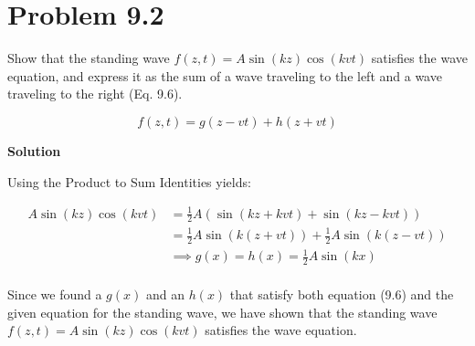 \documentclass[12pt]{article}
\newcommand{\enterProblemHeader}[1]{
	\rhead{#1}
}
\newenvironment{homeworkProblem}[1]{
    \section{Problem #1}
    \enterProblemHeader{#1}
}{
	\pagebreak
}
\newcommand{\solution}{\textbf{\large Solution}}
\begin{document}
\begin{homeworkProblem}{9.2}
	Show that the standing wave $f(z, t) = A \sin(kz) \cos(kvt)$ satisfies the
	wave equation, and express it as the sum of a wave traveling to the left and
	a wave traveling to the right (Eq. 9.6).

	\begin{equation}\tag{9.6}
		f(z, t) = g(z - vt) + h(z + vt)
	\end{equation}

	\solution

	Using the Product to Sum Identities yields:

	\begin{align*}
		A \sin(kz) \cos(kvt) &= \frac 12 A \left( \sin(kz + kvt) + \sin(kz -
		kvt) \right)\\
		&= \frac 12 A \sin(k(z + vt)) + \frac 12 A \sin(k(z - vt))\\
		&\implies g(x) = h(x) = \frac 12 A \sin(kx)\\
	\end{align*}

	Since we found a $g(x)$ and an $h(x)$ that satisfy both equation (9.6) and
	the given equation for the standing wave, we have shown that the standing
	wave $f(z, t) = A \sin(kz) \cos(kvt)$ satisfies the wave equation.
\end{homeworkProblem}
\end{document}
